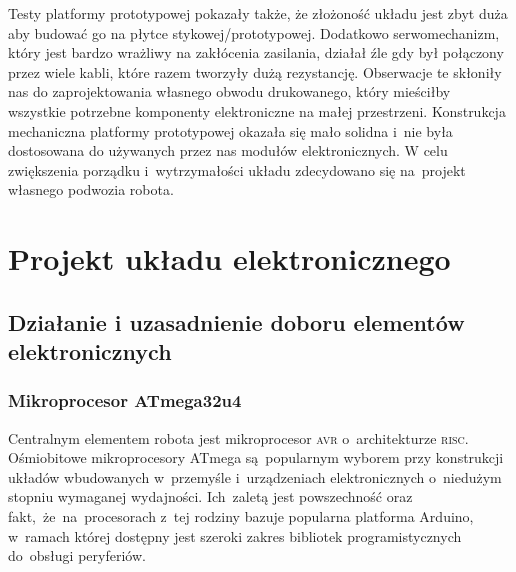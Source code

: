 \documentclass[11pt]{article}
\begin{document}
Testy platformy prototypowej pokazały także, że złożoność układu jest zbyt duża aby budować go na płytce stykowej/prototypowej.
Dodatkowo serwomechanizm, który jest bardzo wrażliwy na zakłócenia zasilania, działał źle gdy był połączony przez wiele kabli, które razem tworzyły dużą rezystancję. Obserwacje te skłoniły nas do zaprojektowania własnego obwodu drukowanego, który mieściłby wszystkie potrzebne komponenty elektroniczne na małej przestrzeni.
Konstrukcja mechaniczna platformy prototypowej okazała się mało solidna i~nie była dostosowana do używanych przez nas modułów elektronicznych. W celu zwiększenia porządku i~wytrzymałości układu zdecydowano się na~projekt własnego podwozia robota.

\section{Projekt układu elektronicznego}
\subsection{Działanie i uzasadnienie doboru elementów elektronicznych}
\subsubsection{Mikroprocesor ATmega32u4}
Centralnym elementem robota jest mikroprocesor \textsc{avr} o~architekturze \textsc{risc}. Ośmiobitowe mikroprocesory ATmega są~popularnym wyborem przy konstrukcji układów wbudowanych w~przemyśle i~urządzeniach elektronicznych o~niedużym stopniu wymaganej wydajności.
Ich~zaletą jest powszechność oraz fakt,~że~na~procesorach z~tej rodziny bazuje popularna platforma Arduino, w~ramach której dostępny jest szeroki zakres bibliotek programistycznych do~obsługi peryferiów. 
\end{document}
